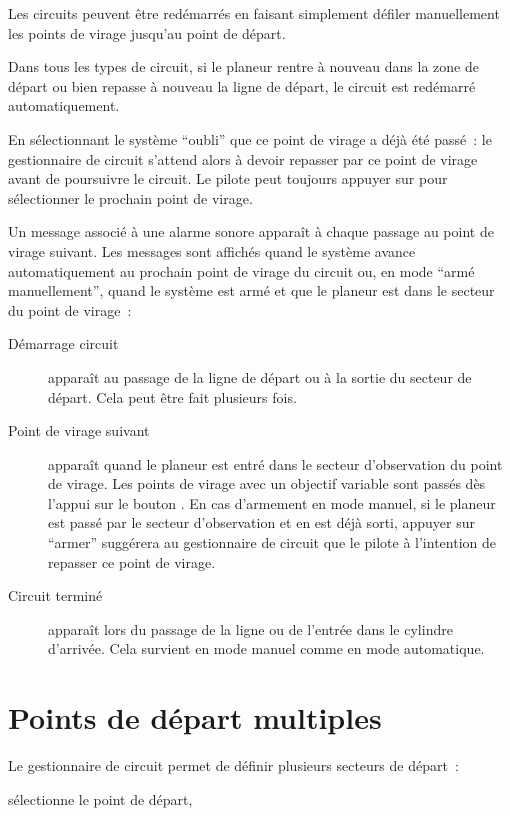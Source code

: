 \tip{} Les circuits peuvent être redémarrés en faisant simplement défiler manuellement
les points de virage jusqu'au point de départ.

Dans tous les types de circuit, si le planeur rentre à nouveau dans la zone de départ ou bien repasse à 
nouveau la ligne de départ, le circuit est redémarré automatiquement.

En sélectionnant  le système ``oubli'' que ce point
de virage a déjà été passé~: le gestionnaire de circuit
s'attend alors à devoir repasser par ce point de virage
avant de poursuivre le circuit. Le pilote peut toujours appuyer sur  pour sélectionner le prochain point de virage.

Un message associé à une alarme sonore apparaît à chaque passage au point de virage suivant. Les
messages sont affichés quand le système avance automatiquement au prochain point
de virage du circuit ou, en mode ``armé manuellement'', quand le système est armé et que le planeur est dans le secteur du point de virage~:
\begin{description}
\item[Démarrage circuit] apparaît au passage de la ligne de départ ou à la sortie du secteur de départ. Cela peut être fait plusieurs fois.
\item[Point de virage suivant] apparaît quand le planeur est entré dans le secteur
d'observation du point de virage. Les points de virage avec un objectif variable
sont passés dès l'appui sur le bouton . En cas d'armement en mode manuel, si le
planeur est passé par le secteur d'observation et en est déjà sorti, appuyer sur ``armer'' suggérera
au gestionnaire de circuit que le pilote à l'intention de repasser
ce point de virage.
\item[Circuit terminé] apparaît lors du passage de la ligne
ou de l'entrée dans le cylindre d'arrivée. Cela survient en mode manuel comme en mode automatique.
\end{description}



\section{Points de départ multiples}\label{sec:alternate-starts}

Le gestionnaire de circuit permet de définir plusieurs secteurs de départ~:

\blink{} sélectionne le point de départ, \blink{}

